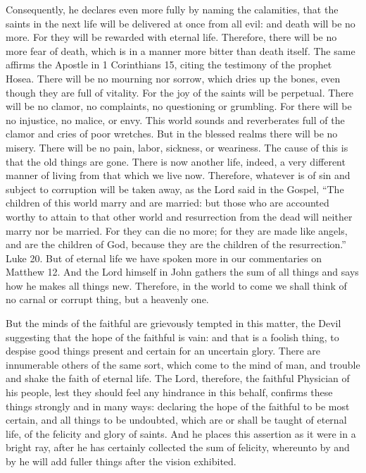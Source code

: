 Consequently, he declares even more fully by naming the calamities, that the saints in the next life will be delivered at once from all evil: and death will be no more. For they will be rewarded with eternal life. Therefore, there will be no more fear of death, which is in a manner more bitter than death itself. The same affirms the Apostle in 1 Corinthians 15, citing the testimony of the prophet Hosea. There will be no mourning nor sorrow, which dries up the bones, even though they are full of vitality. For the joy of the saints will be perpetual. There will be no clamor, no complaints, no questioning or grumbling. For there will be no injustice, no malice, or envy. This world sounds and reverberates full of the clamor and cries of poor wretches. But in the blessed realms there will be no misery. There will be no pain, labor, sickness, or weariness. The cause of this is that the old things are gone. There is now another life, indeed, a very different manner of living from that which we live now. Therefore, whatever is of sin and subject to corruption will be taken away, as the Lord said in the Gospel, “The children of this world marry and are married: but those who are accounted worthy to attain to that other world and resurrection from the dead will neither marry nor be married. For they can die no more; for they are made like angels, and are the children of God, because they are the children of the resurrection.” Luke 20. But of eternal life we have spoken more in our commentaries on Matthew 12. And the Lord himself in John gathers the sum of all things and says how he makes all things new. Therefore, in the world to come we shall think of no carnal or corrupt thing, but a heavenly one.

But the minds of the faithful are grievously tempted in this matter, the Devil suggesting that the hope of the faithful is vain: and that is a foolish thing, to despise good things present and certain for an uncertain glory. There are innumerable others of the same sort, which come to the mind of man, and trouble and shake the faith of eternal life. The Lord, therefore, the faithful Physician of his people, lest they should feel any hindrance in this behalf, confirms these things strongly and in many ways: declaring the hope of the faithful to be most certain, and all things to be undoubted, which are or shall be taught of eternal life, of the felicity and glory of saints. And he places this assertion as it were in a bright ray, after he has certainly collected the sum of felicity, whereunto by and by he will add fuller things after the vision exhibited.

